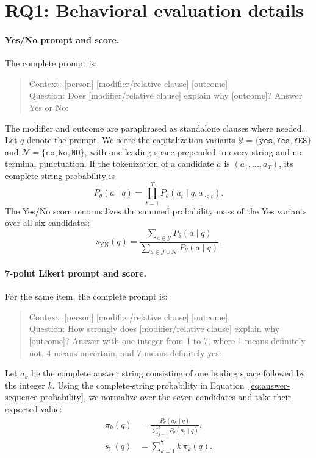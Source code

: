 \documentclass[11pt]{article}
\begin{document}


\normalsize
\clearpage
\appendix

\section{RQ1: Behavioral evaluation details}
\label{app:behavior-details}

\paragraph{Yes/No prompt and score.}
The complete prompt is:
\begin{quote}\small\ttfamily
Context: [person] [modifier/relative clause] [outcome]\\
Question: Does [modifier/relative clause] explain why [outcome]? Answer Yes or No:
\end{quote}
The modifier and outcome are paraphrased as standalone clauses where needed. Let $q$ denote the prompt. We score the capitalization variants $\mathcal{Y}=\{\texttt{yes},\texttt{Yes},\texttt{YES}\}$ and $\mathcal{N}=\{\texttt{no},\texttt{No},\texttt{NO}\}$, with one leading space prepended to every string and no terminal punctuation. If the tokenization of a candidate $a$ is $(a_1,\ldots,a_T)$, its complete-string probability is
\begin{equation}
P_\theta(a\mid q)=\prod_{t=1}^{T}
P_\theta(a_t\mid q,a_{<t}).
\label{eq:answer-sequence-probability}
\end{equation}
The Yes/No score renormalizes the summed probability mass of the Yes variants over all six candidates:
\begin{equation}
s_{\mathrm{YN}}(q)=
\frac{\sum_{a\in\mathcal{Y}}P_\theta(a\mid q)}
{\sum_{a\in\mathcal{Y}\cup\mathcal{N}}P_\theta(a\mid q)}.
\label{eq:yes-probability}
\end{equation}

\paragraph{7-point Likert prompt and score.}
For the same item, the complete prompt is:
\begin{quote}\small\ttfamily
Context: [person] [modifier/relative clause] [outcome].\\
Question: How strongly does [modifier/relative clause] explain why [outcome]? Answer with one integer from 1 to 7, where 1 means definitely not, 4 means uncertain, and 7 means definitely yes:
\end{quote}
Let $a_k$ be the complete answer string consisting of one leading space followed by the integer $k$. Using the complete-string probability in Equation~\ref{eq:answer-sequence-probability}, we normalize over the seven candidates and take their expected value:
\begin{align}
\pi_k(q)
  &=\frac{P_\theta(a_k\mid q)}
  {\sum_{j=1}^{7}P_\theta(a_j\mid q)},\\
s_{\mathrm{L}}(q)&=\sum_{k=1}^{7}k\,\pi_k(q).
\label{eq:Likert-score}
\end{align}
\end{document}
